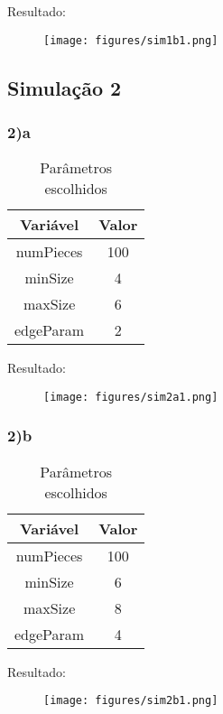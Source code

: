 \documentclass{article}
\begin{document}
\begin{multicols}{2}
Resultado: 
\begin{figure}[H]
    \centering
    \texttt{[image: figures/sim1b1.png]}
    \caption{}
    \label{sim1b1}
\end{figure}

\subsection{Simulação 2}

\subsubsection{2)a}

\begin{table}[H]
    \centering
    \caption{Parâmetros escolhidos}
    \begin{tabular}{| c | c |}
        \hline
        \textbf{Variável} & \textbf{Valor} \\
        \hline
        numPieces & 100 \\
        minSize & 4 \\
        maxSize & 6 \\
        edgeParam & 2 \\
        \hline
    \end{tabular}
\end{table}

Resultado: 
\begin{figure}[H]
    \centering
    \texttt{[image: figures/sim2a1.png]}
    \caption{}
    \label{sim2a1}
\end{figure}

\subsubsection{2)b}
\begin{table}[H]
    \centering
    \caption{Parâmetros escolhidos}
    \begin{tabular}{| c | c |}
        \hline
        \textbf{Variável} & \textbf{Valor} \\
        \hline
        numPieces & 100 \\
        minSize & 6 \\
        maxSize & 8 \\
        edgeParam & 4 \\
        \hline
    \end{tabular}
\end{table}

Resultado: 
\begin{figure}[H]
    \centering
    \texttt{[image: figures/sim2b1.png]}
    \caption{}
    \label{sim2b1}
\end{figure}


\end{multicols}
\end{document}
